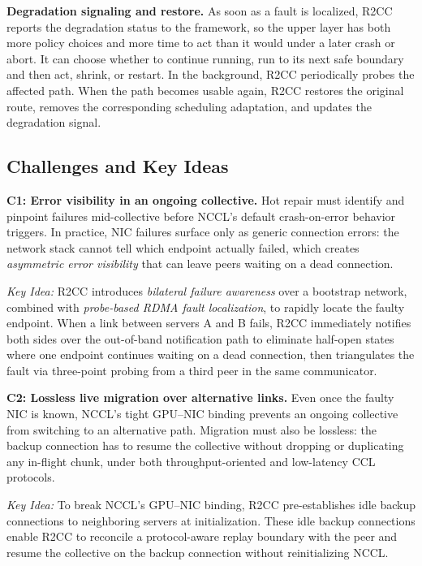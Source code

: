\smallskip\noindent\textbf{Degradation signaling and restore.}
As soon as a fault is localized, R2CC reports the degradation status to the framework, so the upper layer has both more policy choices and more time to act than it would under a later crash or abort. It can choose whether to continue running, run to its next safe boundary and then act, shrink, or restart. In the background, R2CC periodically probes the affected path. When the path becomes usable again, R2CC restores the original route, removes the corresponding scheduling adaptation, and updates the degradation signal.

\subsection{Challenges and Key Ideas}

\textbf{C1: Error visibility in an ongoing collective.} Hot repair must identify and pinpoint failures mid-collective before NCCL's default crash-on-error behavior triggers. In practice, NIC failures surface only as generic connection errors: the network stack cannot tell which endpoint actually failed, which creates \textit{asymmetric error visibility} that can leave peers waiting on a dead connection.

\textit{Key Idea:} R2CC introduces \textit{bilateral failure awareness} over a bootstrap network, combined with \textit{probe-based RDMA fault localization}, to rapidly locate the faulty endpoint. When a link between servers A and B fails, R2CC immediately notifies both sides over the out-of-band notification path to eliminate half-open states where one endpoint continues waiting on a dead connection, then triangulates the fault via three-point probing from a third peer in the same communicator.

\smallskip\noindent\textbf{C2: Lossless live migration over alternative links.} Even once the faulty NIC is known, NCCL's tight GPU--NIC binding prevents an ongoing collective from switching to an alternative path. Migration must also be lossless: the backup connection has to resume the collective without dropping or duplicating any in-flight chunk, under both throughput-oriented and low-latency CCL protocols.

\textit{Key Idea:} To break NCCL's GPU–NIC binding, R2CC pre-establishes idle backup connections to neighboring servers at initialization. These idle backup connections enable R2CC to reconcile a protocol-aware replay boundary with the peer and resume the collective on the backup connection without reinitializing NCCL.

